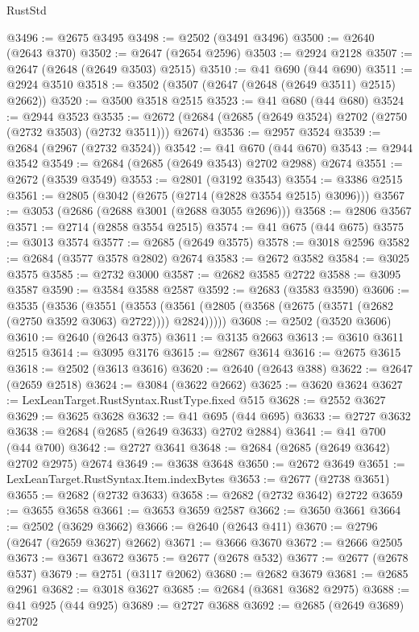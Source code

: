 \begin{lexlean}{RustStd}
\begin{coremodule}
{\begin{coremodule}
{{{{{{{{{{{{{{{{{{{{{{{{{{@3496 := @2675 @3495
@3498 := @2502 (@3491 @3496)
@3500 := @2640 (@2643 @370)
@3502 := @2647 (@2654 @2596)
@3503 := @2924 @2128
@3507 := @2647 (@2648 (@2649 @3503) @2515)
@3510 := @41 @690 (@44 @690)
@3511 := @2924 @3510
@3518 := @3502 (@3507 (@2647 (@2648 (@2649 @3511) @2515) @2662))
@3520 := @3500 @3518 @2515
@3523 := @41 @680 (@44 @680)
@3524 := @2944 @3523
@3535 := @2672 (@2684 (@2685 (@2649 @3524) @2702 (@2750 (@2732 @3503) (@2732 @3511))) @2674)
@3536 := @2957 @3524
@3539 := @2684 (@2967 (@2732 @3524))
@3542 := @41 @670 (@44 @670)
@3543 := @2944 @3542
@3549 := @2684 (@2685 (@2649 @3543) @2702 @2988) @2674
@3551 := @2672 (@3539 @3549)
@3553 := @2801 (@3192 @3543)
@3554 := @3386 @2515
@3561 := @2805 (@3042 (@2675 (@2714 (@2828 @3554 @2515) @3096)))
@3567 := @3053 (@2686 (@2688 @3001 (@2688 @3055 @2696)))
@3568 := @2806 @3567
@3571 := @2714 (@2858 @3554 @2515)
@3574 := @41 @675 (@44 @675)
@3575 := @3013 @3574
@3577 := @2685 (@2649 @3575)
@3578 := @3018 @2596
@3582 := @2684 (@3577 @3578 @2802) @2674
@3583 := @2672 @3582
@3584 := @3025 @3575
@3585 := @2732 @3000
@3587 := @2682 @3585 @2722
@3588 := @3095 @3587
@3590 := @3584 @3588 @2587
@3592 := @2683 (@3583 @3590)
@3606 := @3535
    (@3536
      (@3551
        (@3553 (@3561 (@2805 (@3568 (@2675 (@3571 (@2682 (@2750 @3592 @3063) @2722)))) @2824)))))
@3608 := @2502 (@3520 @3606)
@3610 := @2640 (@2643 @375)
@3611 := @3135 @2663
@3613 := @3610 @3611 @2515
@3614 := @3095 @3176
@3615 := @2867 @3614
@3616 := @2675 @3615
@3618 := @2502 (@3613 @3616)
@3620 := @2640 (@2643 @388)
@3622 := @2647 (@2659 @2518)
@3624 := @3084 (@3622 @2662)
@3625 := @3620 @3624
@3627 := LexLeanTarget.RustSyntax.RustType.fixed @515
@3628 := @2552 @3627
@3629 := @3625 @3628
@3632 := @41 @695 (@44 @695)
@3633 := @2727 @3632
@3638 := @2684 (@2685 (@2649 @3633) @2702 @2884)
@3641 := @41 @700 (@44 @700)
@3642 := @2727 @3641
@3648 := @2684 (@2685 (@2649 @3642) @2702 @2975) @2674
@3649 := @3638 @3648
@3650 := @2672 @3649
@3651 := LexLeanTarget.RustSyntax.Item.indexBytes
@3653 := @2677 (@2738 @3651)
@3655 := @2682 (@2732 @3633)
@3658 := @2682 (@2732 @3642) @2722
@3659 := @3655 @3658
@3661 := @3653 @3659 @2587
@3662 := @3650 @3661
@3664 := @2502 (@3629 @3662)
@3666 := @2640 (@2643 @411)
@3670 := @2796 (@2647 (@2659 @3627) @2662)
@3671 := @3666 @3670
@3672 := @2666 @2505
@3673 := @3671 @3672
@3675 := @2677 (@2678 @532)
@3677 := @2677 (@2678 @537)
@3679 := @2751 (@3117 @2062)
@3680 := @2682 @3679
@3681 := @2685 @2961
@3682 := @3018 @3627
@3685 := @2684 (@3681 @3682 @2975)
@3688 := @41 @925 (@44 @925)
@3689 := @2727 @3688
@3692 := @2685 (@2649 @3689) @2702
}}}}}}}}}}}}}}}}}}}}}}}}}}
\end{coremodule}}
\end{coremodule}
\end{lexlean}
